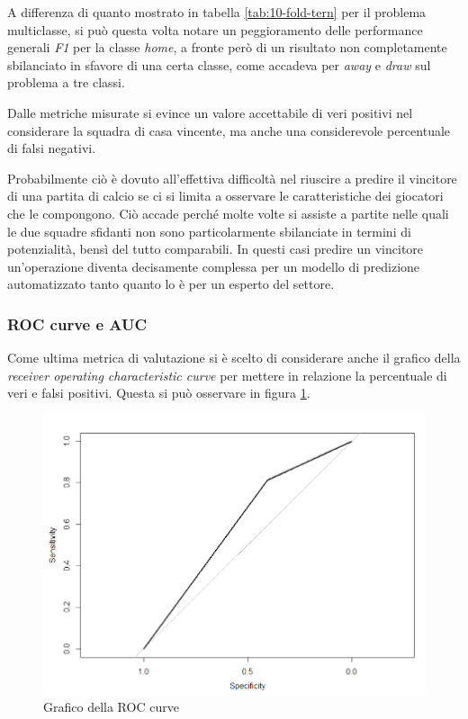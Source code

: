 \documentclass[hidelinks, 12pt]{article}
\begin{document}
A differenza di quanto mostrato in tabella \ref{tab:10-fold-tern} per il problema multiclasse, si può questa volta notare un peggioramento delle performance generali \textit{F1} per la classe \textit{home}, a fronte però di un risultato non completamente sbilanciato in sfavore di una certa classe, come accadeva per \textit{away} e \textit{draw} sul problema a tre classi.

Dalle metriche misurate si evince un valore accettabile di veri positivi nel considerare la squadra di casa vincente, ma anche una considerevole percentuale di falsi negativi.

Probabilmente ciò è dovuto all'effettiva difficoltà nel riuscire a predire il vincitore di una partita di calcio se ci si limita a osservare le caratteristiche dei giocatori che le compongono. Ciò accade perché molte volte si assiste a partite nelle quali le due squadre sfidanti non sono particolarmente sbilanciate in termini di potenzialità, bensì del tutto comparabili. In questi casi predire un vincitore un'operazione diventa decisamente complessa per un modello di predizione automatizzato tanto quanto lo è per un esperto del settore.


\clearpage
\subsubsection{ROC curve e AUC}

Come ultima metrica di valutazione si è scelto di considerare anche il grafico della \textit{receiver operating characteristic curve} per mettere in relazione la percentuale di veri e falsi positivi. Questa si può osservare in figura \ref{fig:perf-roc}.

\begin{figure}[H]
	\centering
	\includegraphics[scale=0.6]{images/06_roc.png}
	\caption[Grafico della ROC curve]{Grafico della ROC curve}
	\label{fig:perf-roc}
\end{figure}
\end{document}
